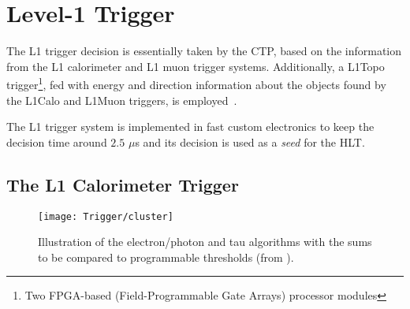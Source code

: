

		
	\section{Level-1 Trigger}
	\label{sec:L1}

		The \ac{L1} trigger decision is essentially taken by the \ac{CTP}, based on the information from the \ac{L1} calorimeter and \ac{L1} muon trigger systems. Additionally, a \ac{L1Topo} trigger\footnote{Two FPGA-based (Field-Programmable Gate Arrays) processor modules}, fed with energy and direction information about the objects found by the \ac{L1Calo} and \ac{L1Muon} triggers, is employed~\cite{ATLASJINST,ATLASTrigger2015,ATLASL1Topo}.

		The \ac{L1} trigger system is implemented in fast custom electronics to keep the decision time around $2.5$ $\mu$s and its decision is used as a \emph{seed} for the \ac{HLT}. 


		\subsection*{The L1 Calorimeter Trigger}

			\begin{wrapfigure}{R}{.5\textwidth}
				\centering
				\texttt{[image: Trigger/cluster]}
				\caption{\label{fig:calo_cluster} Illustration of the electron/photon and tau algorithms with the sums to be compared to programmable thresholds (from \cite{ATLASTrigger2010}).}
			\end{wrapfigure}

